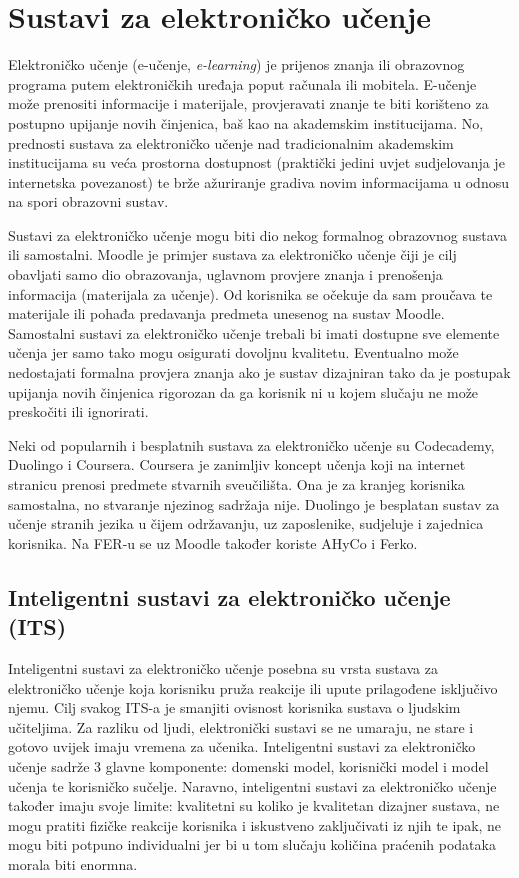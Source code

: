 \documentclass[times, utf8, zavrsni, numeric]{fer}
\begin{document}
\chapter{Sustavi za elektroničko učenje}
Elektroničko učenje (e-učenje, \textit{e-learning}) je prijenos znanja ili obrazovnog programa putem elektroničkih uređaja poput računala ili mobitela. E-učenje može prenositi informacije i materijale, provjeravati znanje te biti korišteno za postupno upijanje novih činjenica, baš kao na akademskim institucijama.\citep{derekstock} No, prednosti sustava za elektroničko učenje nad tradicionalnim akademskim institucijama su veća prostorna dostupnost (praktički jedini uvjet sudjelovanja je internetska povezanost) te brže ažuriranje gradiva novim informacijama u odnosu na spori obrazovni sustav.
\citep{eLearningNC}
\par
Sustavi za elektroničko učenje mogu biti dio nekog formalnog obrazovnog sustava ili samostalni. Moodle je primjer sustava za elektroničko učenje čiji je cilj obavljati samo dio obrazovanja, uglavnom provjere znanja i prenošenja informacija (materijala za učenje). Od korisnika se očekuje da sam proučava te materijale ili pohađa predavanja predmeta unesenog na sustav Moodle.\citep{moodle} Samostalni sustavi za elektroničko učenje trebali bi imati dostupne sve elemente učenja jer samo tako mogu osigurati dovoljnu kvalitetu. Eventualno može nedostajati formalna provjera znanja ako je sustav dizajniran tako da je postupak upijanja novih činjenica rigorozan da ga korisnik ni u kojem slučaju ne može preskočiti ili ignorirati. 
\par
Neki od popularnih i besplatnih sustava za elektroničko učenje su Codecademy, Duolingo i Coursera. Coursera je zanimljiv koncept učenja koji na internet stranicu prenosi predmete stvarnih sveučilišta. Ona je za kranjeg korisnika samostalna, no stvaranje njezinog sadržaja nije.\citep{coursera} Duolingo je besplatan sustav za učenje stranih jezika u čijem održavanju, uz zaposlenike, sudjeluje i zajednica korisnika.\citep{duolingo} Na FER-u se uz Moodle također koriste AHyCo i Ferko.\citep{ferko}
\pagebreak
\section{Inteligentni sustavi za elektroničko učenje (ITS)}
Inteligentni sustavi za elektroničko učenje posebna su vrsta sustava za elektroničko učenje koja korisniku pruža reakcije ili upute prilagođene isključivo njemu. Cilj svakog ITS-a je smanjiti ovisnost korisnika sustava o ljudskim učiteljima. Za razliku od ljudi, elektronički sustavi se ne umaraju, ne stare i gotovo uvijek imaju vremena za učenika. Inteligentni sustavi za elektroničko učenje sadrže 3 glavne komponente: domenski model, korisnički model i model učenja te korisničko sučelje.\citep{aect}\citep{markurban} Naravno, inteligentni sustavi za elektroničko učenje također imaju svoje limite: kvalitetni su koliko je kvalitetan dizajner sustava, ne mogu pratiti fizičke reakcije korisnika i iskustveno zaključivati iz njih te ipak, ne mogu biti potpuno individualni jer bi u tom slučaju količina praćenih podataka morala biti enormna.\citep{grubisic2006}
\end{document}
